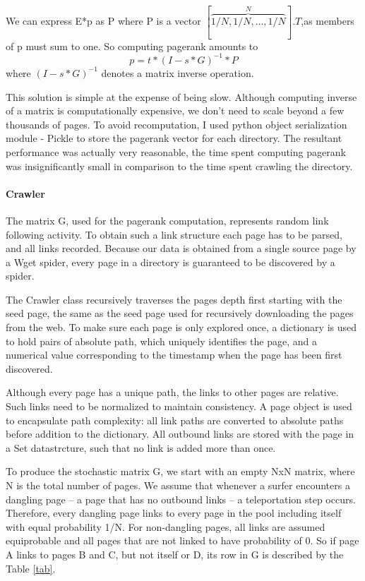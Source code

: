 \documentclass[12pt,twoside,notitlepage]{report}
\begin{document}
We can express E*p as P where P is a vector
\([\overbrace{1/N,1/N,\dots,1/N}^N].T\),as members of p must sum to one.
So computing pagerank amounts to
\begin{equation}
p  = t*(I-s*G)^{-1}*P
\end{equation}
where \((I-s*G)^{-1}\) denotes a matrix inverse operation.

This solution is simple at the expense of being slow. Although computing
inverse of a matrix is computationally expensive, we don't need to scale beyond
a few thousands of pages.  To avoid recomputation, I used python object
serialization module - Pickle to store the pagerank vector for each directory.
The resultant performance was actually very reasonable, the time spent
computing pagerank was insignificantly small in comparison to the time spent
crawling the directory.

\paragraph{Crawler}
The matrix G, used for the pagerank computation, represents random link
following activity. To obtain such a link structure each page has to be parsed,
and all links recorded. Because our data is obtained from a single source page
by a Wget spider, every page in a directory is guaranteed to be discovered by a
spider.

The Crawler class recursively traverses the pages depth first starting with the seed page,
the same as the seed page used for recursively downloading the pages from the
web. To make sure each page is only explored once, a dictionary is used to
hold pairs of absolute path, which uniquely identifies the page, and a
numerical value corresponding to the timestamp when the page has been first
discovered.

Although every page has a unique path, the links to other pages are relative.
Such links need to be normalized to maintain consistency.
A page object is used to encapsulate path complexity: all link paths are
converted to absolute paths before addition to the dictionary.
All outbound links are stored with the page in a Set datastrcture,
such that no link is added more than once. 

To produce the stochastic matrix G, we start with an empty NxN matrix, where N
is the total number of pages. We assume that whenever a surfer encounters a dangling page -- a page that has no
outbound links -- a teleportation step occurs. Therefore, every dangling page
links to every page in the pool including itself with equal probability 1/N. For non-dangling
pages, all links are assumed equiprobable and all pages that are not linked to
have probability of 0. So if page A links to pages B and C, but not itself or
D, its row in G is described by the Table \ref{tab}.
\end{document}
